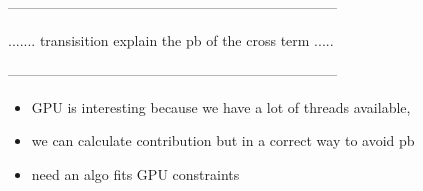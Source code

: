 \documentclass[oribibl]{llncs2e/llncs}
\begin{document}
-----------------------------------------------------------------------

....... transisition explain the pb of the cross term ..... 

-----------------------------------------------------------------------


\begin{itemize}
\item  GPU is interesting because we have a lot of threads available, 
\item we can calculate contribution but in a correct way to avoid pb 
\item need an algo fits GPU constraints
\end{itemize}





\end{document}
